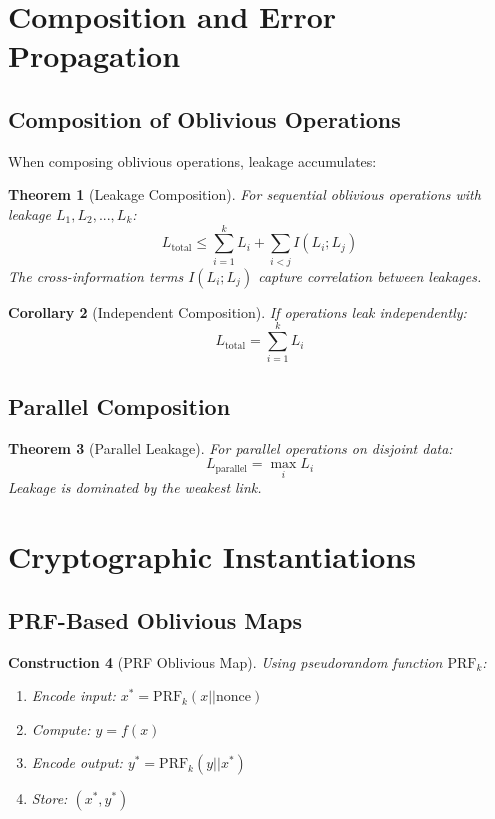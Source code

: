 \documentclass[11pt,final]{article}
\newtheorem{theorem}{Theorem}[section]
\newtheorem{corollary}[theorem]{Corollary}
\newtheorem{construction}[theorem]{Construction}
\begin{document}
\section{Composition and Error Propagation}

\subsection{Composition of Oblivious Operations}

When composing oblivious operations, leakage accumulates:

\begin{theorem}[Leakage Composition]
For sequential oblivious operations with leakage $L_1, L_2, ..., L_k$:
\begin{equation}
L_{\text{total}} \leq \sum_{i=1}^k L_i + \sum_{i<j} I(L_i; L_j)
\end{equation}
The cross-information terms $I(L_i; L_j)$ capture correlation between leakages.
\end{theorem}

\begin{corollary}[Independent Composition]
If operations leak independently:
\begin{equation}
L_{\text{total}} = \sum_{i=1}^k L_i
\end{equation}
\end{corollary}

\subsection{Parallel Composition}

\begin{theorem}[Parallel Leakage]
For parallel operations on disjoint data:
\begin{equation}
L_{\text{parallel}} = \max_i L_i
\end{equation}
Leakage is dominated by the weakest link.
\end{theorem}

\section{Cryptographic Instantiations}

\subsection{PRF-Based Oblivious Maps}

\begin{construction}[PRF Oblivious Map]
Using pseudorandom function $\text{PRF}_k$:
\begin{enumerate}
\item Encode input: $x^* = \text{PRF}_k(x || \text{nonce})$
\item Compute: $y = f(x)$
\item Encode output: $y^* = \text{PRF}_k(y || x^*)$
\item Store: $(x^*, y^*)$
\end{enumerate}
\end{construction}
\end{document}
